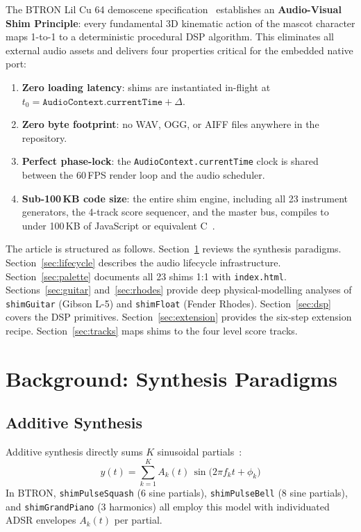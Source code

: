 \documentclass[10pt,journal,compsoc,twocolumn]{article}
\begin{document}
The BTRON Lil Cu 64 demoscene specification~\cite{lilcu64spec} establishes an
\textbf{Audio-Visual Shim Principle}: every fundamental 3D kinematic action of
the mascot character maps 1-to-1 to a deterministic procedural DSP algorithm.
This eliminates all external audio assets and delivers four properties critical
for the embedded native port:
\begin{enumerate}[leftmargin=*]
    \item \textbf{Zero loading latency}: shims are instantiated in-flight
    at $t_0 = \texttt{AudioContext.currentTime} + \Delta$.
    \item \textbf{Zero byte footprint}: no WAV, OGG, or AIFF files anywhere in
    the repository.
    \item \textbf{Perfect phase-lock}: the \texttt{AudioContext.currentTime}
    clock is shared between the 60\,FPS render loop and the audio scheduler.
    \item \textbf{Sub-100\,KB code size}: the entire shim engine, including all
    23 instrument generators, the 4-track score sequencer, and the master bus,
    compiles to under 100\,KB of JavaScript or equivalent C~\cite{lilcu64spec}.
\end{enumerate}

The article is structured as follows.
Section~\ref{sec:background} reviews the synthesis paradigms.
Section~\ref{sec:lifecycle} describes the audio lifecycle infrastructure.
Section~\ref{sec:palette} documents all 23 shims 1:1 with
\texttt{index.html}.
Sections~\ref{sec:guitar} and~\ref{sec:rhodes} provide deep physical-modelling
analyses of \texttt{shimGuitar} (Gibson L-5) and \texttt{shimFloat} (Fender
Rhodes).
Section~\ref{sec:dsp} covers the DSP primitives.
Section~\ref{sec:extension} provides the six-step extension recipe.
Section~\ref{sec:tracks} maps shims to the four level score tracks.

\section{Background: Synthesis Paradigms}
\label{sec:background}

\subsection{Additive Synthesis}

Additive synthesis directly sums $K$ sinusoidal partials~\cite{beauchamp2007analysis}:
\begin{equation}
y(t) = \sum_{k=1}^{K} A_k(t)\,\sin\!\bigl(2\pi f_k t + \phi_k\bigr)
\label{eq:additive}
\end{equation}
In BTRON, \texttt{shimPulseSquash} (6 sine partials), \texttt{shimPulseBell}
(8 sine partials), and \texttt{shimGrandPiano} (3 harmonics) all employ this
model with individuated ADSR envelopes $A_k(t)$ per partial.
\end{document}
